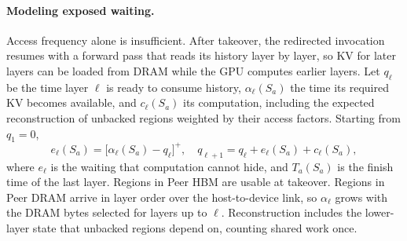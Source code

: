 \paragraph{Modeling exposed waiting.}
Access frequency alone is insufficient. After takeover, the redirected
invocation resumes with a forward pass that reads its history layer by
layer, so KV for later layers can be loaded from DRAM while the GPU
computes earlier layers. Let
$q_\ell$ be the time layer $\ell$ is ready to consume history,
$\alpha_\ell(S_a)$ the time its required KV becomes available, and
$c_\ell(S_a)$ its computation, including the expected reconstruction of
unbacked regions weighted by their access factors. Starting from
$q_1=0$,
\begin{equation}
 e_\ell(S_a)=\bigl[\alpha_\ell(S_a)-q_\ell\bigr]^+,\quad
 q_{\ell+1}=q_\ell+e_\ell(S_a)+c_\ell(S_a),
 \label{eq:overlap}
\end{equation}
where $e_\ell$ is the waiting that computation cannot hide, and
$T_a(S_a)$ is the finish time of the last layer. Regions in Peer HBM are
usable at takeover. Regions in Peer DRAM arrive in layer order over the
host-to-device link, so $\alpha_\ell$ grows with the DRAM bytes selected
for layers up to $\ell$. Reconstruction includes the lower-layer state
that unbacked regions depend on, counting shared work once.

